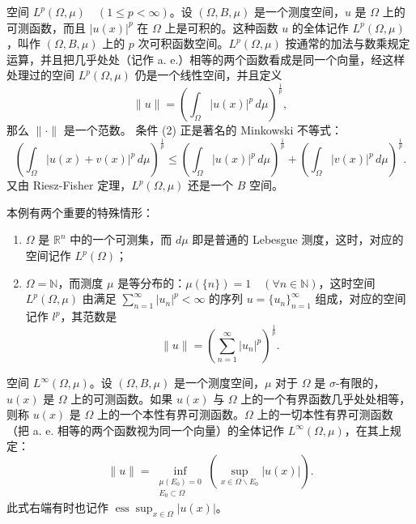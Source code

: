 \documentclass[lang=cn,newtx,10pt,scheme=chinese,thmcnt=chapter]{elegantbook}
\begin{document}
\begin{example}
空间 $L^p(\Omega, \mu) \quad (1 \leqslant p < \infty)$。设 $(\Omega, B, \mu)$ 是一个测度空间，$u$ 是 $\Omega$ 上的可测函数，而且 $|u(x)|^p$ 在 $\Omega$ 上是可积的。这种函数 $u$ 的全体记作 $L^p(\Omega, \mu)$，叫作 $(\Omega, B, \mu)$ 上的 $p$ 次可积函数空间。$L^p(\Omega, \mu)$ 按通常的加法与数乘规定运算，并且把几乎处处（记作 a. e.）相等的两个函数看成是同一个向量，经这样处理过的空间 $L^p(\Omega, \mu)$ 仍是一个线性空间，并且定义
\[
\|u\| = \left( \int_{\Omega} |u(x)|^p \, d\mu \right)^{\frac{1}{p}},
\]
那么 $\|\cdot\|$ 是一个范数。 条件 (2) 正是著名的 Minkowski 不等式：
\[
\left( \int_{\Omega} |u(x) + v(x)|^p \, d\mu \right)^{\frac{1}{p}} \leqslant \left( \int_{\Omega} |u(x)|^p \, d\mu \right)^{\frac{1}{p}} + \left( \int_{\Omega} |v(x)|^p \, d\mu \right)^{\frac{1}{p}}.
\]
又由 Riesz-Fisher 定理，$L^p(\Omega, \mu)$ 还是一个 $B$ 空间。
\end{example}
\begin{note}本例有两个重要的特殊情形：
\begin{enumerate}
  \item $\Omega$ 是 $\mathbb{R}^n$ 中的一个可测集，而 $d\mu$ 即是普通的 Lebesgue 测度，这时，对应的空间记作 $L^p(\Omega)$；
  \item $\Omega = \mathbb{N}$，而测度 $\mu$ 是等分布的：$\mu(\{n\}) = 1 \quad (\forall n \in \mathbb{N})$，这时空间 $L^p(\Omega, \mu)$ 由满足 $\sum_{n=1}^{\infty} |u_n|^p < \infty$ 的序列 $u = \{u_n\}_{n=1}^{\infty}$ 组成，对应的空间记作 $l^p$，其范数是
  \[
  \|u\| = \left( \sum_{n=1}^{\infty} |u_n|^p \right)^{\frac{1}{p}}.
  \]
\end{enumerate}
\end{note}
\begin{definition}
空间 $L^{\infty}(\Omega, \mu)$。设 $(\Omega, B, \mu)$ 是一个测度空间，$\mu$ 对于 $\Omega$ 是 $\sigma$-有限的，$u(x)$ 是 $\Omega$ 上的可测函数。如果 $u(x)$ 与 $\Omega$ 上的一个有界函数几乎处处相等，则称 $u(x)$ 是 $\Omega$ 上的一个本性有界可测函数。$\Omega$ 上的一切本性有界可测函数（把 a. e. 相等的两个函数视为同一个向量）的全体记作 $L^{\infty}(\Omega, \mu)$，在其上规定：
\[
\|u\| = \inf_{\substack{\mu(E_0) = 0 \\ E_0 \subset \Omega}} \left( \sup_{x \in \Omega \backslash E_0} |u(x)| \right).
\]
此式右端有时也记作 $\operatorname{ess} \sup_{x \in \Omega} |u(x)|$。

\end{definition}
\end{document}
